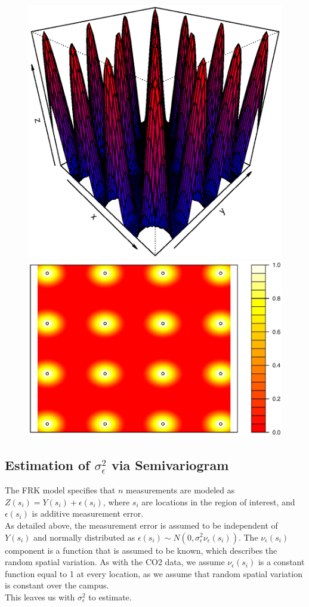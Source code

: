 \documentclass[11pt]{article}
\begin{document}
\begin{figure}[H]
\centering
\includegraphics[width=0.55\columnwidth]{./Images/res3}
\includegraphics[width=0.44\columnwidth]{./Images/res31}
\caption{}
\label{fig:res3}
\end{figure}

\subsection{Estimation of $\sigma^2_{\epsilon}$ via Semivariogram}

The FRK model specifies that $n$ measurements are modeled as $Z(s_i) = Y(s_i) + \epsilon(s_i)$, where $s_i$ are locations in the region of interest, and $\epsilon(s_i)$ is additive measurement error.\\

As detailed above, the measurement error is assumed to be independent of $Y(s_i)$ and normally distributed as $\epsilon(s_i) \sim N(0,\sigma^2_\epsilon \nu_\epsilon (s_i))$.  The $\nu_\epsilon (s_i)$ component is a function that is assumed to be known, which describes the random spatial variation.  As with the CO2 data, we assume $\nu_\epsilon (s_i)$ is a constant function equal to 1 at every location, as we assume that random spatial variation is constant over the campus. \\

This leaves us with $\sigma^2_\epsilon$ to estimate. \\
\end{document}
